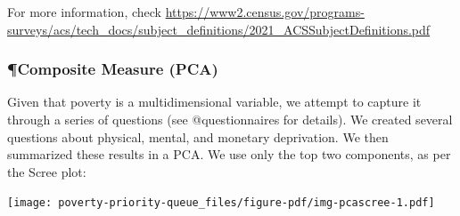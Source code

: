 \documentclass[
]{report}
\begin{document}
For more information, check
\url{https://www2.census.gov/programs-surveys/acs/tech_docs/subject_definitions/2021_ACSSubjectDefinitions.pdf}

\hypertarget{composite-measure-pca}{%
\subsubsection{¶Composite Measure (PCA)}\label{composite-measure-pca}}

Given that poverty is a multidimensional variable, we attempt to capture
it through a series of questions (see @questionnaires for details). We
created several questions about physical, mental, and monetary
deprivation. We then summarized these results in a PCA. We use only the
top two components, as per the Scree plot:

\texttt{[image: poverty-priority-queue\_files/figure-pdf/img-pcascree-1.pdf]}
\end{document}
